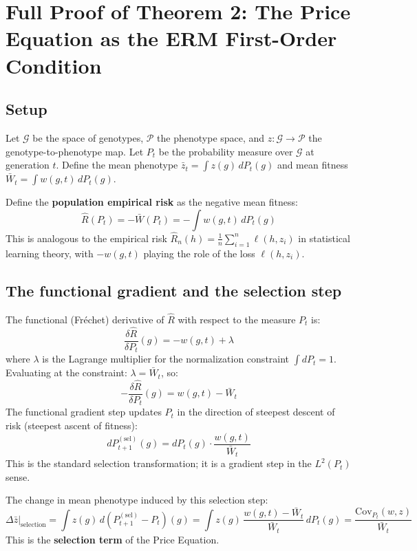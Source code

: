 \documentclass[12pt]{article}
\theoremstyle{remark}
\begin{document}
\section{Full Proof of Theorem 2: The Price Equation as the ERM First-Order Condition}

\subsection{Setup}

Let $\mathcal{G}$ be the space of genotypes, $\mathcal{P}$ the phenotype space, and $z: \mathcal{G} \to \mathcal{P}$ the genotype-to-phenotype map. Let $P_t$ be the probability measure over $\mathcal{G}$ at generation $t$. Define the mean phenotype $\bar{z}_t = \int z(g)\,dP_t(g)$ and mean fitness $\bar{W}_t = \int w(g,t)\,dP_t(g)$.

Define the \textbf{population empirical risk} as the negative mean fitness:
\[
  \hat{R}(P_t) = -\bar{W}(P_t) = -\int w(g,t)\,dP_t(g)
\]
This is analogous to the empirical risk $\hat{R}_n(h) = \frac{1}{n}\sum_{i=1}^n \ell(h, z_i)$ in statistical learning theory, with $-w(g,t)$ playing the role of the loss $\ell(h, z_i)$.

\subsection{The functional gradient and the selection step}

The functional (Fr\'echet) derivative of $\hat{R}$ with respect to the measure $P_t$ is:
\[
  \frac{\delta \hat{R}}{\delta P_t}(g) = -w(g,t) + \lambda
\]
where $\lambda$ is the Lagrange multiplier for the normalization constraint $\int dP_t = 1$. Evaluating at the constraint: $\lambda = \bar{W}_t$, so:
\[
  -\frac{\delta \hat{R}}{\delta P_t}(g) = w(g,t) - \bar{W}_t
\]
The functional gradient step updates $P_t$ in the direction of steepest descent of risk (steepest ascent of fitness):
\[
  dP_{t+1}^{(\text{sel})}(g) = dP_t(g) \cdot \frac{w(g,t)}{\bar{W}_t}
\]
This is the standard selection transformation; it is a gradient step in the $L^2(P_t)$ sense.

The change in mean phenotype induced by this selection step:
\[
  \Delta\bar{z}\big|_{\text{selection}}
  = \int z(g)\,d\!\left(P_{t+1}^{(\text{sel})} - P_t\right)(g)
  = \int z(g)\,\frac{w(g,t) - \bar{W}_t}{\bar{W}_t}\,dP_t(g)
  = \frac{\mathrm{Cov}_{P_t}(w, z)}{\bar{W}_t}
\]
This is the \textbf{selection term} of the Price Equation.
\end{document}
